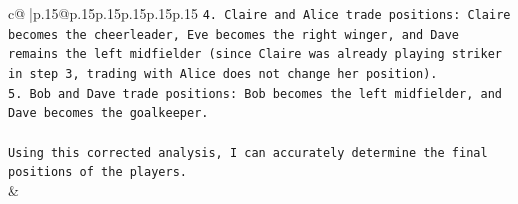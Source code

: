 \documentclass{article}
\begin{document}
{\begin{supertabular}{c@{$\;$}|p{.15\linewidth}@{}p{.15\linewidth}p{.15\linewidth}p{.15\linewidth}p{.15\linewidth}p{.15\linewidth}}
{{{\texttt{4. Claire and Alice trade positions: Claire becomes the cheerleader, Eve becomes the right winger, and Dave remains the left midfielder (since Claire was already playing striker in step 3, trading with Alice does not change her position).} \\
\texttt{5. Bob and Dave trade positions: Bob becomes the left midfielder, and Dave becomes the goalkeeper.} \\
\\ 
\texttt{Using this corrected analysis, I can accurately determine the final positions of the players.} \\
            }
        }
    }
    & \\ \\

\end{supertabular}
}
\end{document}

